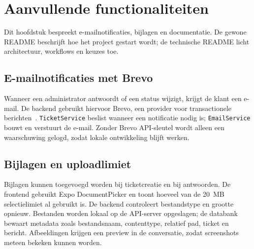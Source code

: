 
\chapter{Aanvullende functionaliteiten}%
\label{ch:aanvullende-functionaliteiten}

Dit hoofdstuk bespreekt e-mailnotificaties, bijlagen en documentatie. De gewone README beschrijft hoe het project gestart wordt; de technische README licht architectuur, workflows en keuzes toe.

\section{E-mailnotificaties met Brevo}

Wanneer een administrator antwoordt of een status wijzigt, krijgt de klant een e-mail. De backend gebruikt hiervoor Brevo, een provider voor transactionele berichten~\autocite{BrevoApiDocs2026}. \texttt{TicketService} beslist wanneer een notificatie nodig is; \texttt{EmailService} bouwt en verstuurt de e-mail. Zonder Brevo API-sleutel wordt alleen een waarschuwing gelogd, zodat lokale ontwikkeling blijft werken.

\section{Bijlagen en uploadlimiet}

Bijlagen kunnen toegevoegd worden bij ticketcreatie en bij antwoorden. De frontend gebruikt Expo DocumentPicker en toont hoeveel van de 20~MB selectielimiet al gebruikt is. De backend controleert bestandstype en grootte opnieuw. Bestanden worden lokaal op de API-server opgeslagen; de databank bewaart metadata zoals bestandsnaam, contenttype, relatief pad, ticket en bericht. Afbeeldingen krijgen een preview in de conversatie, zodat screenshots meteen bekeken kunnen worden.
